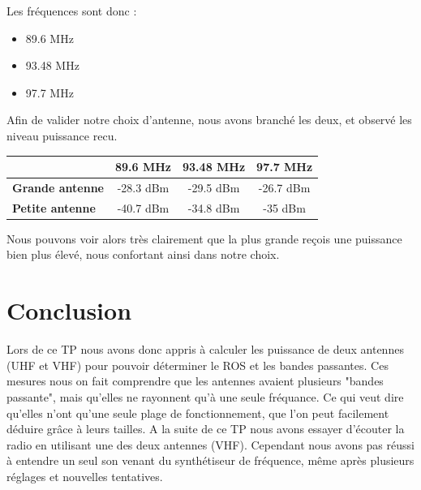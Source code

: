 \documentclass[a4paper,12pt]{report}            %
\begin{document}
Les fréquences sont donc :
\begin{itemize}
	\item 89.6 MHz
	\item 93.48 MHz
	\item 97.7 MHz
\end{itemize}

Afin de valider notre choix d'antenne, nous avons branché les deux, et observé les niveau puissance
recu.

\begin{center}
	\begin{tabular}{||p{4cm}||*{3}{c|}|}
		\hline
		\bfseries                & 89.6 MHz  & 93.48 MHz & 97.7 MHz  \\
		\hline
		\hline
		\bfseries Grande antenne & -28.3 dBm & -29.5 dBm & -26.7 dBm \\
		\hline
		\bfseries Petite antenne & -40.7 dBm & -34.8 dBm & -35 dBm   \\
		\hline
		\hline
	\end{tabular}
\end{center}

Nous pouvons voir alors très clairement que la plus grande reçois une puissance bien plus élevé,
nous confortant ainsi dans notre choix.

\chapter{Conclusion}

    Lors de ce TP nous avons donc appris à calculer les puissance de deux antennes (UHF et VHF) pour pouvoir déterminer
le ROS et les bandes passantes. Ces mesures nous on fait comprendre que les antennes avaient plusieurs "bandes passante", 
mais qu'elles ne rayonnent qu'à une seule fréquance. Ce qui veut dire qu'elles n'ont qu'une seule plage de fonctionnement,
que l'on peut facilement déduire grâce à leurs tailles. A la suite de ce TP nous avons essayer d'écouter la radio en utilisant
une des deux antennes (VHF). Cependant nous avons pas réussi à entendre un seul son venant du synthétiseur de fréquence, même  
après plusieurs réglages et nouvelles tentatives.
\end{document}
